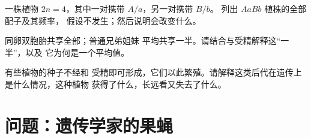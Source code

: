 \begin{exercise}[$\star\star\star$]\label{exo:g12:meiosis-genetic-shuffling:13}
一株植物 $2n = 4$，其中一对携带 $A/a$，另一对携带 $B/b$。
列出 $AaBb$ 植株的全部配子及其频率，
假设不发生；然后说明会改变什么。
\end{exercise}

\begin{exercise}[$\star\star\star$]\label{exo:g12:meiosis-genetic-shuffling:14}
同卵双胞胎共享全部；普通兄弟姐妹
平均共享一半。请结合与受精解释这“一半”，以及
它为何是一个平均值。
\end{exercise}

\begin{exercise}[$\star\star\star$]\label{exo:g12:meiosis-genetic-shuffling:15}
有些植物的种子不经和
受精即可形成，它们以此繁殖。请解释这类后代在遗传上是什么情况，这种植物
获得了什么，长远看又失去了什么。
\end{exercise}

\section{问题：遗传学家的果蝇}

